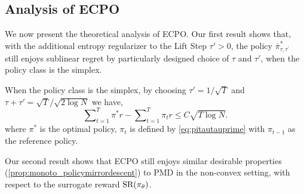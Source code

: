 \subsection{Analysis of ECPO}
We now present the theoretical analysis of ECPO. Our first result shows that, with the additional entropy regularizer to the Lift Step $\tau' > 0$, the policy $\bar{\pi}_{\tau,\tau^{\prime}}^*$ still enjoys sublinear regret by particularly designed choice of $\tau$ and $\tau'$, when the policy class is the simplex. 

\begin{thm}
When the policy class is the simplex, by choosing $\tau'=1/\sqrt{T}$ and $\tau + \tau' = \sqrt{T} / \sqrt{2\log N}$ we have,
\begin{equation*}
    \sum\nolimits_{t=1}^{T}{\pi^* r} - \sum\nolimits_{t=1}^{T}{\pi_t r} \le C\sqrt{T\log N}.
\end{equation*}
where $\pi^*$ is the optimal policy, $\pi_{t}$ is defined by \cref{eq:pitautauprime} with $\pi_{t-1}$ as the reference policy. 
\end{thm}

Our second result shows that ECPO still enjoys similar desirable properties (\cref{prop:monoto_policymirrordescent}) to PMD
in the non-convex setting, with respect to the surrogate reward $\text{SR}(\pi_\theta)$.

